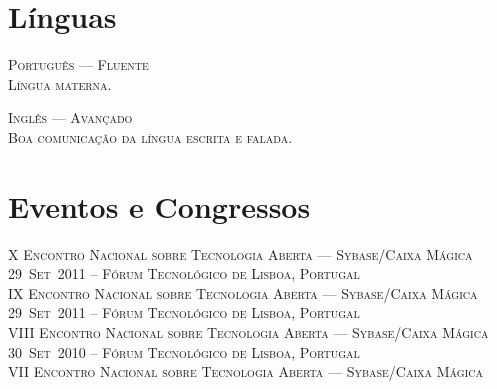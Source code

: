 \documentclass[a4paper,fontsize=10pt]{scrartcl} %
\begin{document}
\begin{minipage}[t]{0.46\textwidth}
\section{Línguas}
\textsc{Português --- Fluente}\\
\small\textsc{Língua materna.}
\\\par
\textsc{Inglês --- Avançado}\\
\small\textsc{Boa comunicação da língua escrita e falada.}
\\\par
\section{Eventos e Congressos}
\textsc{X Encontro Nacional sobre Tecnologia Aberta --- Sybase/Caixa Mágica}\\
\small\textsc{29~Set~2011 -- Fórum Tecnológico de Lisboa, Portugal}\\ \normalsize
\textsc{IX Encontro Nacional sobre Tecnologia Aberta --- Sybase/Caixa Mágica}\\
\small\textsc{29~Set~2011 -- Fórum Tecnológico de Lisboa, Portugal}\\ \normalsize
\textsc{VIII Encontro Nacional sobre Tecnologia Aberta --- Sybase/Caixa Mágica}\\
\small\textsc{30~Set~2010 -- Fórum Tecnológico de Lisboa, Portugal}\\ \normalsize
\textsc{VII Encontro Nacional sobre Tecnologia Aberta --- Sybase/Caixa Mágica}\\

\end{minipage}
\end{document}
